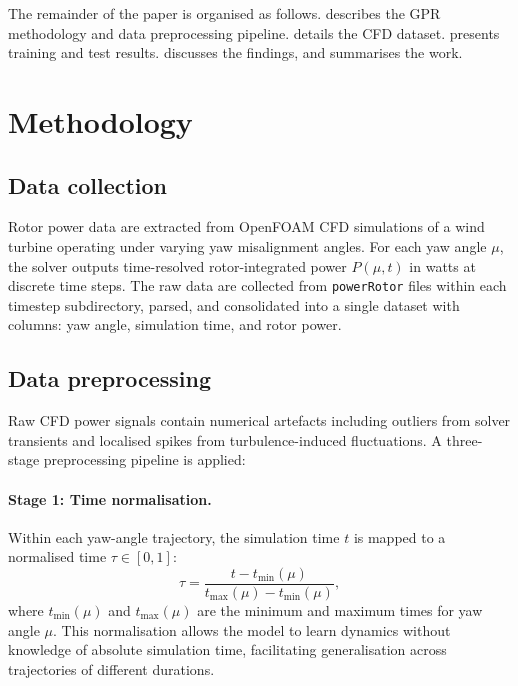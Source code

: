 \documentclass[12pt]{article}
\begin{document}
The remainder of the paper is organised as follows.
 describes the GPR methodology and data preprocessing pipeline.
 details the CFD dataset.
 presents training and test results.
 discusses the findings, and  summarises the work.


\section{Methodology}
\label{sec:methodology}

\subsection{Data collection}
\label{sec:data_collection}

Rotor power data are extracted from OpenFOAM CFD simulations of a wind turbine operating under varying yaw misalignment angles.
For each yaw angle $\mu$, the solver outputs time-resolved rotor-integrated power $P(\mu, t)$ in watts at discrete time steps.
The raw data are collected from \texttt{powerRotor} files within each timestep subdirectory, parsed, and consolidated into a single dataset with columns: yaw angle, simulation time, and rotor power.

\subsection{Data preprocessing}
\label{sec:preprocessing}

Raw CFD power signals contain numerical artefacts including outliers from solver transients and localised spikes from turbulence-induced fluctuations.
A three-stage preprocessing pipeline is applied:

\paragraph{Stage 1: Time normalisation.}
Within each yaw-angle trajectory, the simulation time $t$ is mapped to a normalised time $\tau \in [0, 1]$:
\begin{equation}
    \tau = \frac{t - t_{\min}(\mu)}{t_{\max}(\mu) - t_{\min}(\mu)},
\end{equation}
where $t_{\min}(\mu)$ and $t_{\max}(\mu)$ are the minimum and maximum times for yaw angle $\mu$.
This normalisation allows the model to learn dynamics without knowledge of absolute simulation time, facilitating generalisation across trajectories of different durations.
\end{document}
